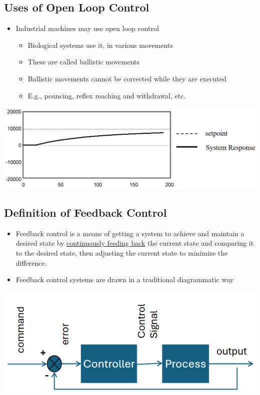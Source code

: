 \documentclass[10pt]{article}
\begin{document}
\subsection*{Uses of Open Loop Control}
\begin{itemize}
	\item Industrial machines may use open loop control
	\begin{itemize}
        \item Biological systems use it, in various movements
        \item These are called ballistic movements
        \item Ballistic movements cannot be corrected while they are executed
        \item E.g., pouncing, reflex reaching and withdrawal, etc.
    \end{itemize}
\end{itemize}
\begin{center} 
	\includegraphics*[width=\textwidth]{L2_4.png} 
\end{center}

\subsection*{Definition of Feedback Control}
\begin{itemize}
	\item Feedback control is a means of getting a system to achieve and maintain a desired state by \underline{continuously feeding back} the current state and comparing it to the desired state, then adjusting the current state to minimize the difference.
	\item Feedback control systems are drawn in a traditional diagrammatic way
\end{itemize}
\begin{center} 
	\includegraphics*[width=\textwidth]{L2_5.png}
\end{center}
\end{document}
